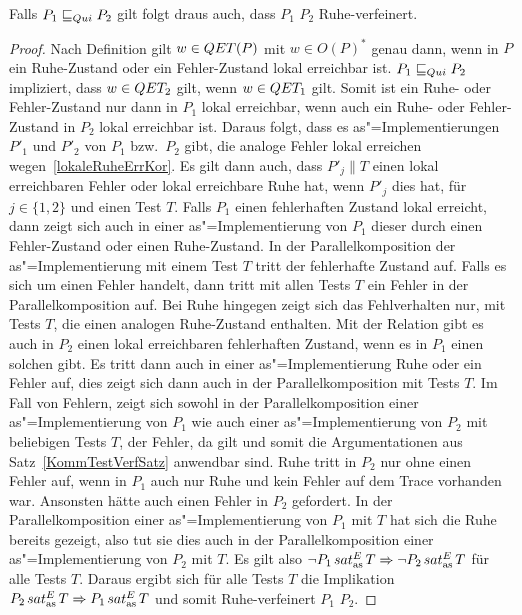 \begin{Satz}
  \label{RuheTestVerfSatz}
  Falls $P_1 \sqsubseteq  _{Qui} P_2$ gilt folgt draus auch, dass $P_1$ $P_2$ Ruhe-verfeinert.
\end{Satz}
\begin{proof}
  Nach Definition gilt $w\in QET (P)$ mit $w\in O(P)^*$ genau dann, wenn in $P$
  ein Ruhe-Zustand oder ein Fehler-Zustand lokal erreichbar ist. $P_1 \sqsubseteq  _{Qui} P_2$
  impliziert, dass $w\in QET _2$ gilt, wenn $w\in QET _1$ gilt. Somit ist ein
  Ruhe- oder Fehler-Zustand nur dann in $P_1$ lokal erreichbar, wenn auch ein
  Ruhe- oder Fehler-Zustand in $P_2$ lokal erreichbar ist. Daraus folgt, dass
  es as"=Implementierungen $P'_1$ und $P'_2$ von $P_1$ bzw.\ $P_2$ gibt, die
  analoge Fehler lokal erreichen wegen~\ref{lokaleRuheErrKor}. Es gilt dann
  auch, dass $P'_j\|T$ einen lokal erreichbaren Fehler oder lokal erreichbare
  Ruhe hat, wenn $P'_j$ dies hat, für $j\in\{1,2\}$ und einen Test $T$. Falls
  $P_1$ einen \glqq fehlerhaften Zustand\grqq{} lokal erreicht, dann zeigt sich
  auch in einer as"=Implementierung von $P_1$ dieser durch einen Fehler-Zustand
  oder einen Ruhe-Zustand. In der Parallelkomposition der as"=Implementierung
  mit einem Test $T$ tritt der \glqq fehlerhafte Zustand\grqq{} auf. Falls es
  sich um einen Fehler handelt, dann tritt mit allen Tests $T$ ein Fehler in
  der Parallelkomposition auf. Bei Ruhe hingegen zeigt sich das \glqq
  Fehlverhalten\grqq{} nur, mit Tests $T$, die einen analogen Ruhe-Zustand
  enthalten. Mit der Relation \QRel{} gibt es auch in $P_2$ einen lokal
  erreichbaren \glqq fehlerhaften Zustand\grqq{}, wenn es in $P_1$ einen
  solchen gibt. Es tritt dann auch in einer as"=Implementierung Ruhe oder ein
  Fehler auf, dies zeigt sich dann auch in der Parallelkomposition mit Tests
  $T$. Im Fall von Fehlern, zeigt sich sowohl in der Parallelkomposition einer
  as"=Implementierung von $P_1$ wie auch einer as"=Implementierung von $P_2$
  mit beliebigen Tests $T$, der Fehler, da \ERel{} gilt und somit die
  Argumentationen aus Satz~\ref{KommTestVerfSatz} anwendbar sind. Ruhe tritt
  in $P_2$ nur ohne einen Fehler auf, wenn in $P_1$ auch nur Ruhe und kein
  Fehler auf dem Trace vorhanden war. Ansonsten hätte \ERel{} auch einen Fehler
  in $P_2$ gefordert. In der Parallelkomposition einer as"=Implementierung von
  $P_1$ mit $T$ hat sich die Ruhe bereits gezeigt, also tut sie dies auch in
  der Parallelkomposition einer as"=Implementierung von $P_2$ mit $T$. Es gilt
  also $\neg P_1 \hspace{0.05cm}sat_\mathrm{as}^E\hspace{0.05cm} T \Rightarrow \neg P_2 \hspace{0.05cm}sat_\mathrm{as}^E\hspace{0.05cm} T$ für alle Tests $T$.
  Daraus ergibt sich für alle Tests $T$ die Implikation $P_2 \hspace{0.05cm}sat_\mathrm{as}^E\hspace{0.05cm} T
  \Rightarrow P_1 \hspace{0.05cm}sat_\mathrm{as}^E\hspace{0.05cm} T$ und somit Ruhe-verfeinert $P_1$ $P_2$.
\end{proof}

